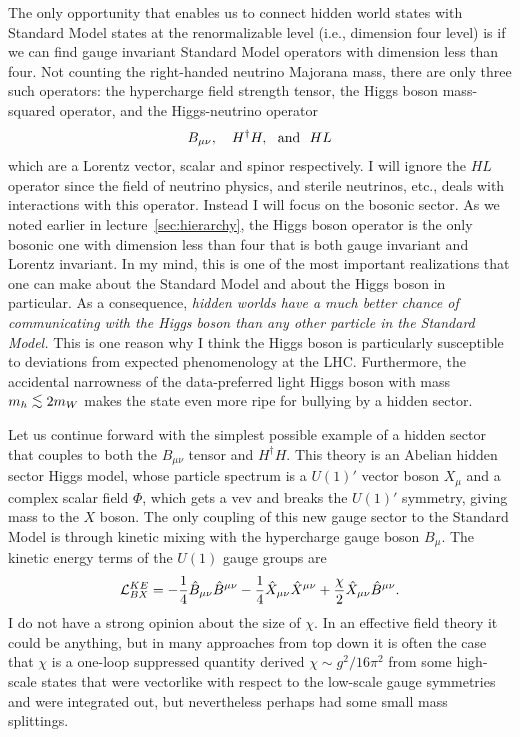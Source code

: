 \documentclass[12pt]{article}
\def\beq{\begin{eqnarray}}
\def\eeq{\end{eqnarray}}
\newcommand{\lsim}{\lower.7ex\hbox{$\;\stackrel{\textstyle<}{\sim}\;$}}
\begin{document}
The only opportunity that enables us to connect hidden world states with Standard Model states at the renormalizable level (i.e., dimension four level) is if we can find gauge invariant Standard Model operators with dimension less than four.  Not counting the right-handed neutrino Majorana mass, there are only three such operators: the hypercharge field strength tensor, the Higgs boson mass-squared operator, and the Higgs-neutrino operator
\beq
B_{\mu\nu}, ~~~H^\dagger H,~~{\rm and}~~HL
\eeq
which are a Lorentz vector, scalar and spinor respectively. I will ignore the $HL$ operator since the field of neutrino physics, and sterile neutrinos, etc., deals with interactions with this operator. Instead I will focus on the bosonic sector. As we noted earlier in lecture~\ref{sec:hierarchy}, the Higgs boson operator is the only bosonic one with dimension less than four that is both gauge invariant and Lorentz invariant. In my mind, this is one of the most important realizations that one can make about the Standard Model and about the Higgs boson in particular. As a consequence, {\it hidden worlds have a much better chance of communicating with the Higgs boson than any other particle in the Standard Model.}  This is one reason why I think the Higgs boson is particularly susceptible to deviations from expected phenomenology at the LHC.  Furthermore, the accidental narrowness of the data-preferred light Higgs boson with mass $m_h\lsim 2m_W$ makes the state even more ripe for bullying by a hidden sector.


Let us continue forward with the simplest possible example of a hidden sector that couples to both the $B_{\mu\nu}$  tensor and $H^\dagger H$. This theory is an Abelian hidden sector Higgs model, whose particle spectrum is a $U(1)'$ vector boson $X_\mu$ and a complex scalar field $\Phi$, which gets a vev and breaks the $U(1)'$ symmetry, giving mass to the $X$ boson.
The only coupling of this new gauge sector to the Standard Model is through kinetic mixing with
the hypercharge gauge boson $B_\mu$.
The kinetic energy terms of the $U(1)$ gauge groups are
\beq
{\cal L}^{KE}_{BX} = -\frac{1}{4} \hat{B}_{\mu\nu} \hat{B}^{\mu\nu}-\frac{1}{4} \hat{X}_{\mu\nu} \hat{X}^{\mu\nu} + \frac{\chi}{2} \hat{X}_{\mu\nu} \hat{B}^{\mu\nu}.
\label{eq:KEBX}
\eeq
I do not have a strong opinion about the size of $\chi$. In an effective field theory it could be anything, but in many approaches from top down it is often the case that $\chi$ is a one-loop suppressed quantity derived $\chi\sim g^2/16\pi^2$ from some high-scale states that were vectorlike with respect to the low-scale gauge symmetries and were integrated out, but nevertheless perhaps had some small mass splittings. 
\end{document}

